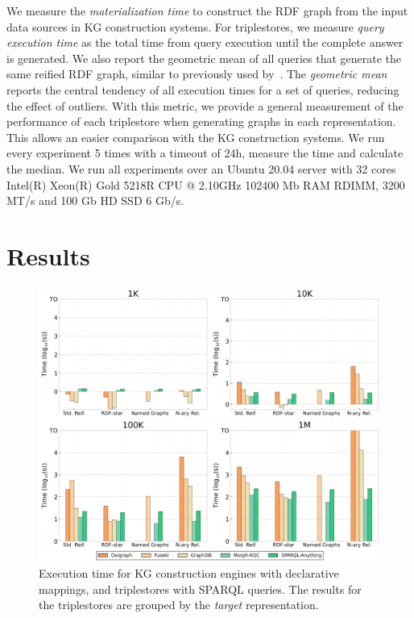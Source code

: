 We measure the \textit{materialization time} to construct the RDF graph from the input data sources in KG construction systems.
For triplestores, we measure \textit{query execution time} as the total time from query execution until the complete answer is generated. 
We also report the geometric mean of all queries that generate the same reified RDF graph, similar to previously used by~\citep{morsey2011dbpedia,schmidt2009sp}. 
The \textit{geometric mean} reports the central tendency of all execution times for a set of queries, reducing the effect of outliers. 
With this metric, we provide a general measurement of the performance of each triplestore when generating graphs in each representation. 
This allows an easier comparison with the KG construction systems. 
We run every experiment 5 times with a timeout of 24h, measure the time and calculate the median.
We run all experiments over an Ubuntu 20.04 server with
32 cores Intel(R) Xeon(R) Gold 5218R CPU @ 2.10GHz
102400 Mb RAM RDIMM, 3200 MT/s and 
100 Gb HD SSD 6 Gb/s. 




\section{Results}
\label{sec:chp6-1_results}


\begin{figure}[t!]
    \centering
    \includegraphics[width=\linewidth]{figures/chp6-1_results-map-queries.pdf}
    \caption[Overall execution times of KG re-construction evaluation]{Execution time for KG construction engines with declarative mappings, and triplestores with SPARQL queries. The results for the triplestores are grouped by the \textit{target} representation.}
    \label{fig:chp6-1_map-queries}
\end{figure}




